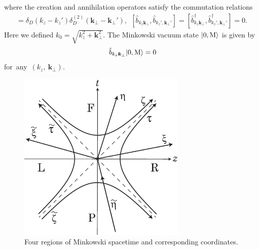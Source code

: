 \documentclass[aps,prd,preprintnumbers,nofootinbib,showpacs,11pt]{revtex4}%
\begin{document}
\begin{widetext}
where the creation and annihilation operators satisfy the commutation relations
\begin{eqnarray}
[{\hat b}_{k_z\bm k_\perp}, {\hat b}_{k_z',\bm k_\perp'}^\dagger]=\delta_D(k_z-k_z') \delta_D^{(2)}(\bm k_\perp-\bm k_\perp'), 
~~
[{\hat b}_{k_z\bm k_\perp}, {\hat b}_{k_z',\bm k_\perp'}]=[{\hat b}_{k_z\bm k_\perp}^\dagger, {\hat b}_{k_z',\bm k_\perp'}^\dagger]=0. 
\end{eqnarray}
Here we defined $k_0=\sqrt{k_z^2+\bm k_\perp^2}$.
The Minkowski vacuum state $|0,{\rm M}\rangle$ is given by 
\begin{eqnarray}
&&\hat b_{k_z\bm k_\perp}|0,{\rm M}\rangle=0 ~~
\label{fourdvacuum}
\end{eqnarray}
for~any~$(k_z,~\bm k_\perp)$.


\begin{figure}[t]
\begin{center}
    \includegraphics[width=8cm]{fig1.eps}
\caption{Four regions of Minkowski spacetime and corresponding coordinates.
\label{fig:coordinate}}
\end{center}
\end{figure}


\end{widetext}
\end{document}
